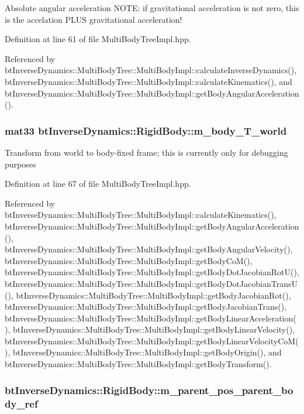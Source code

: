 Absolute angular acceleration NOTE: if gravitational acceleration is not zero, this is the accelation PLUS gravitational acceleration! 

Definition at line 61 of file MultiBodyTreeImpl.hpp.

Referenced by btInverseDynamics::MultiBodyTree::MultiBodyImpl::calculateInverseDynamics(), btInverseDynamics::MultiBodyTree::MultiBodyImpl::calculateKinematics(), and btInverseDynamics::MultiBodyTree::MultiBodyImpl::getBodyAngularAcceleration().\hypertarget{structbt_inverse_dynamics_1_1_rigid_body_c923bac96faf25c431d498493ed9ff0e}{
\subsubsection[m\_\-body\_\-T\_\-world]{\setlength{\rightskip}{0pt plus 5cm}mat33 {\bf btInverseDynamics::RigidBody::m\_\-body\_\-T\_\-world}}}
\label{structbt_inverse_dynamics_1_1_rigid_body_c923bac96faf25c431d498493ed9ff0e}


Transform from world to body-fixed frame; this is currently only for debugging purposes 

Definition at line 67 of file MultiBodyTreeImpl.hpp.

Referenced by btInverseDynamics::MultiBodyTree::MultiBodyImpl::calculateKinematics(), btInverseDynamics::MultiBodyTree::MultiBodyImpl::getBodyAngularAcceleration(), btInverseDynamics::MultiBodyTree::MultiBodyImpl::getBodyAngularVelocity(), btInverseDynamics::MultiBodyTree::MultiBodyImpl::getBodyCoM(), btInverseDynamics::MultiBodyTree::MultiBodyImpl::getBodyDotJacobianRotU(), btInverseDynamics::MultiBodyTree::MultiBodyImpl::getBodyDotJacobianTransU(), btInverseDynamics::MultiBodyTree::MultiBodyImpl::getBodyJacobianRot(), btInverseDynamics::MultiBodyTree::MultiBodyImpl::getBodyJacobianTrans(), btInverseDynamics::MultiBodyTree::MultiBodyImpl::getBodyLinearAcceleration(), btInverseDynamics::MultiBodyTree::MultiBodyImpl::getBodyLinearVelocity(), btInverseDynamics::MultiBodyTree::MultiBodyImpl::getBodyLinearVelocityCoM(), btInverseDynamics::MultiBodyTree::MultiBodyImpl::getBodyOrigin(), and btInverseDynamics::MultiBodyTree::MultiBodyImpl::getBodyTransform().\hypertarget{structbt_inverse_dynamics_1_1_rigid_body_1bae64073eb9e0ff3f0d15c01a8bc9a1}{
\subsubsection[m\_\-parent\_\-pos\_\-parent\_\-body\_\-ref]{ {\bf btInverseDynamics::RigidBody::m\_\-parent\_\-pos\_\-parent\_\-body\_\-ref}}}
\label{structbt_inverse_dynamics_1_1_rigid_body_1bae64073eb9e0ff3f0d15c01a8bc9a1}


